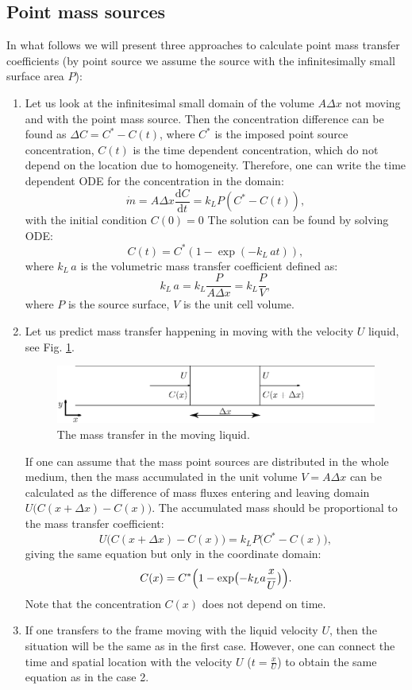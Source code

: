 \documentclass{article}
\newcommand{\beq}{\begin{equation}}
\newcommand{\feq}{\end{equation}}
\newcommand{\vol}{k_L\,a}
\newcommand{\cstar}{C^{*}}
\begin{document}
\subsection{Point mass sources}
In what follows we will present three approaches to calculate point  mass transfer
coefficients (by point source we assume the source with the infinitesimally small surface area $P$):
\begin{enumerate}
\item
Let us look at the infinitesimal small domain of the volume $A \Delta x$ not
moving and with the point mass source.  Then the concentration difference can be found as $\Delta C =
\cstar -
C(t)$, where $\cstar$ is the imposed point source concentration, $C(t)$ is
the time dependent concentration, which do not depend on the location due to homogeneity. Therefore, one can write the time dependent ODE for the
concentration in the domain:
\beq
\dot{m}= A \Delta x \frac{\mathrm{d}C}{\mathrm{d} t} = k_L P (\cstar-C(t)), 
\feq
with the initial condition $C(0)=0$
The solution can be found by solving ODE:
\beq
C(t)= \cstar (1-\exp(-\vol t )), 
\feq
where $\vol$ is the volumetric mass transfer coefficient defined as:
\beq
\vol=k_L \frac{P}{A \Delta x}=k_L \frac{P}{V},
\feq
where $P$ is the source surface, $V$ is the unit cell volume.
\item
Let us predict mass transfer happening in moving with the velocity
$U$ liquid, see Fig. \ref{fig:moving:frame}. 
\begin{figure}[htb!]
\includegraphics[width=\textwidth]{Figures/mass_transfer.eps}
\caption{The mass transfer in the moving liquid. \label{fig:moving:frame}}
\end{figure}

If one can assume that the mass point sources are distributed in the whole medium, then the mass accumulated in the unit volume $V=A \Delta x$ can be calculated as the difference of 
mass fluxes entering and leaving domain $U \bigl(C(x+\Delta x)-C(x)\bigr)$. The accumulated mass should be proportional
to the mass transfer coefficient:
\beq
U \bigl(C(x+\Delta x)-C(x)\bigr)=k_L P \bigl(\cstar-C(x)\bigr), 
\feq 
giving the same equation but only in the coordinate domain:
\beq
C(x)= \cstar \Bigl(1-\exp\bigl(-k_L a \frac{x}{U} \bigr)\Bigr).
\label{main:mass:transfer:expression} 
\feq
Note that the concentration $C(x)$ does not depend on time. 

\item If one transfers to the frame moving with the liquid velocity $U$, then the situation will be
the same as in the first case. However, one can connect the time and spatial location with the
velocity $U$ ($t=\frac{x}{U}$) to obtain the same equation as in the case 2.
\end{enumerate}
\end{document}
